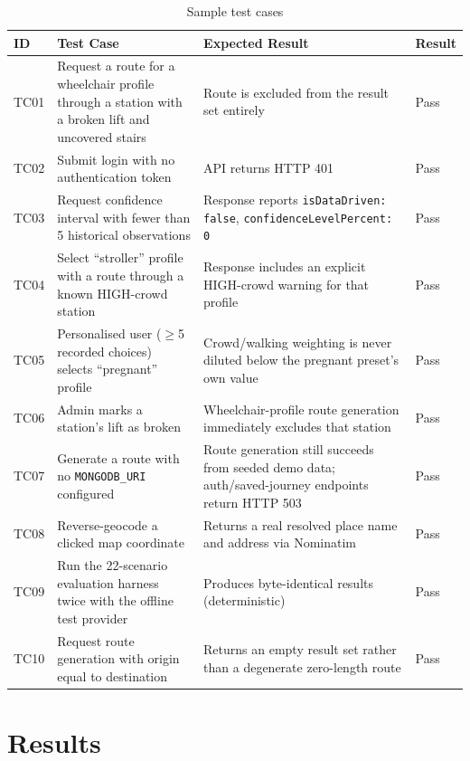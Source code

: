 \documentclass[12pt,a4paper]{report}
\begin{document}
\begin{table}[H]
\centering
\caption{Sample test cases}
\begin{tabular}{@{}p{1cm}p{5.6cm}p{4.2cm}p{2.6cm}@{}}
\toprule
\textbf{ID} & \textbf{Test Case} & \textbf{Expected Result} & \textbf{Result} \\
\midrule
TC01 & Request a route for a wheelchair profile through a station with a broken lift and uncovered
  stairs & Route is excluded from the result set entirely & Pass \\
TC02 & Submit login with no authentication token & API returns HTTP 401 & Pass \\
TC03 & Request confidence interval with fewer than 5 historical observations & Response reports
  \texttt{isDataDriven: false}, \texttt{confidenceLevelPercent: 0} & Pass \\
TC04 & Select ``stroller'' profile with a route through a known HIGH-crowd station & Response
  includes an explicit HIGH-crowd warning for that profile & Pass \\
TC05 & Personalised user (\(\geq\)5 recorded choices) selects ``pregnant'' profile & Crowd/walking
  weighting is never diluted below the pregnant preset's own value & Pass \\
TC06 & Admin marks a station's lift as broken & Wheelchair-profile route generation immediately
  excludes that station & Pass \\
TC07 & Generate a route with no \texttt{MONGODB\_URI} configured & Route generation still succeeds
  from seeded demo data; auth/saved-journey endpoints return HTTP 503 & Pass \\
TC08 & Reverse-geocode a clicked map coordinate & Returns a real resolved place name and address
  via Nominatim & Pass \\
TC09 & Run the 22-scenario evaluation harness twice with the offline test provider & Produces
  byte-identical results (deterministic) & Pass \\
TC10 & Request route generation with origin equal to destination & Returns an empty result set
  rather than a degenerate zero-length route & Pass \\
\bottomrule
\end{tabular}
\end{table}

\chapter{Results}
\end{document}
